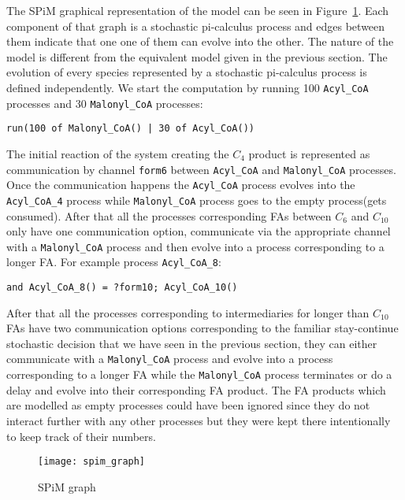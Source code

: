 The SPiM graphical representation of the model can be seen in
Figure~\ref{fig:spim_graph}. Each component of that graph is a
stochastic pi-calculus process and edges between them indicate that
one one of them can evolve into the other. The nature of the model is
different from the equivalent model given in the previous section. The
evolution of every species represented by a stochastic pi-calculus
process is defined independently. We start the computation by running 100
\texttt{Acyl\_CoA} processes and 30 \texttt{Malonyl\_CoA} processes:

\begin{verbatim}
run(100 of Malonyl_CoA() | 30 of Acyl_CoA())
\end{verbatim}

The initial reaction of the system creating the $C_4$ product is represented as
communication by channel \texttt{form6} between \texttt{Acyl\_CoA} and
\texttt{Malonyl\_CoA} processes. Once the communication happens the
\texttt{Acyl\_CoA} process evolves into the  \texttt{Acyl\_CoA\_4}
process while \texttt{Malonyl\_CoA} process goes to the empty
process(gets consumed). After that all the processes corresponding
FAs between $C_6$ and $C_{10}$ only have one communication option,
communicate via the appropriate channel with a \texttt{Malonyl\_CoA}
process and then evolve into a process corresponding to a longer
FA. For example process \texttt{Acyl\_CoA\_8}:

\begin{verbatim}
and Acyl_CoA_8() = ?form10; Acyl_CoA_10()
\end{verbatim}

After that all the processes corresponding to intermediaries for longer
than $C_{10}$ FAs have two communication options corresponding to the familiar
stay-continue stochastic decision that we have seen in the previous section, they
can either communicate with a \texttt{Malonyl\_CoA} process and evolve
into a process corresponding to a longer FA while the
\texttt{Malonyl\_CoA} process terminates or do a delay and evolve into
their corresponding FA product. The FA products which are modelled as
empty processes could have been ignored since they do not interact
further with any other processes but they were kept there
intentionally to keep track of their numbers.

\begin{figure}[htbp!]
\centering
\texttt{[image: spim\_graph]}
\caption[SPiM graph]{SPiM graph}
\label{fig:spim_graph}
\end{figure}

